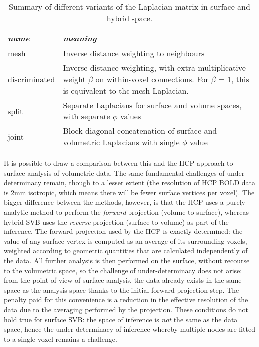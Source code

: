 \begin{table}[h]
\centering
\def\arraystretch{1.5}
\begin{tabular}{p{3cm}|p{11cm}}
\textit{name} & \textit{meaning}                                                                                                                                             \\ \hline
mesh          & Inverse distance weighting to neighbours                                                                                                                     \\
discriminated & Inverse distance weighting, with extra multiplicative weight $\beta$ on within-voxel connections. For $\beta$ = 1, this is equivalent to the mesh Laplacian.
\\
split         & Separate Laplacians for surface and volume spaces, with separate $\phi$ values                                                                               \\
joint         & Block diagonal concatenation of surface and volumetric Laplacians with single $\phi$ value                                                                   
\end{tabular}
\caption{Summary of different variants of the Laplacian matrix in surface and hybrid space.}
\label{laplacian_table}
\end{table}

It is possible to draw a comparison between this and the HCP approach to surface analysis of volumetric data. The same fundamental challenges of under-determinacy remain, though to a lesser extent (the resolution of HCP BOLD data is 2mm isotropic, which means there will be fewer surface vertices per voxel). The bigger difference between the methods, however, is that the HCP uses a purely analytic method to perform the \textit{forward} projection (volume to surface), whereas hybrid SVB uses the \textit{reverse} projection (surface to volume) as part of the inference. The forward projection used by the HCP is exactly determined: the value of any surface vertex is computed as an average of its surrounding voxels, weighted according to geometric quantities that are calculated independently of the data. All further analysis is then performed on the surface, without recourse to the volumetric space, so the challenge of under-determinacy does not arise: from the point of view of surface analysis, the data already exists in the same space as the analysis space thanks to the initial forward projection step. The penalty paid for this convenience is a reduction in the effective resolution of the data due to the averaging performed by the projection. These conditions do not hold true for surface SVB: the space of inference is \textit{not} the same as the data space, hence the under-determinacy of inference whereby multiple nodes are fitted to a single voxel remains a challenge. 

